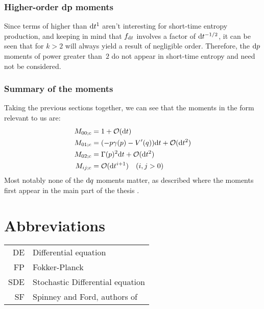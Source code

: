 \subsubsection{Higher-order dp moments}

Since terms of higher than \(\mathrm{d} t^1\) aren't interesting for short-time entropy production, and keeping in mind that \(f_{\mathrm{d} t}\) involves a factor of \(\mathrm{d} t^{-1/2}\), it can be seen that for \(k>2\)  will always yield a result of negligible order. Therefore, the \(\mathrm{d} p\) moments of power greater than~\(2\) do not appear in short-time entropy and need not be considered.

\subsubsection{Summary of the moments}

Taking the previous sections together, we can see that the moments in the form relevant to us are:
%
\begin{align}
	M_{00;c} &= 1 + \mathcal{O}(\mathrm{d} t) \\
	M_{01;c} &= (-p\gamma(p) - V'(q)) \mathrm{d} t + \mathcal{O}(\mathrm{d} t^2) \\
	M_{02;c} &= \Gamma(p)^2 \mathrm{d} t + \mathcal{O}(\mathrm{d} t^2) \\
	M_{ij;c} &= \mathcal{O}(\mathrm{d} t^{i+1}) \quad (i,j > 0)
\end{align}
%
Most notably none of the \(\mathrm{d} q\) moments matter, as described where the moments first appear in the main part of the thesis .


\section{Abbreviations}


\begin{tabular}{r l}
	DE & Differential equation \\
	FP & Fokker-Planck \\
	SDE & Stochastic Differential equation \\
	SF & Spinney and Ford, authors of \cite{sf}
\end{tabular}


